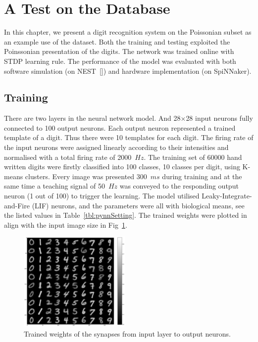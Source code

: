 \section{A Test on the Database}
\label{sec:test}
In this chapter, we present a digit recognition system on the Poissonian subset as an example use of the dataset.
Both the training and testing exploited the Poinssonian presentation of the digits.
The network was trained online with STDP learning rule.
The performance of the model was evaluated with both software simulation (on NEST~[\cite{gewaltig2007nest}]) and hardware implementation (on SpiNNaker). 
\subsection{Training}
There are two layers in the neural network model.
And 28$\times$28 input neurons fully connected to 100 output neurons.
Each output neuron represented a trained template of a digit.
Thus there were 10 templates for each digit.
The firing rate of the input neurons were assigned linearly according to their intensities and normalised with a total firing rate of 2000~$Hz$.
The training set of 60000 hand written digits were firstly classified into 100 classes, 10 classes per digit, using K-means clusters.
Every image was presented 300~$ms$ during training and at the same time a teaching signal of 50~$Hz$ was conveyed to the responding output neuron (1 out of 100) to trigger the learning.
The model utilised Leaky-Integrate-and-Fire (LIF) neurons, and the parameters were all with biological means, see the listed values in Table~\ref{tbl:pynnSetting}.
The trained weights were plotted in align with the input image size in Fig~\ref{Fig:weight}.
\begin{figure}[hbt!]
	\centering
	\includegraphics[width=0.48\textwidth]{images/weight.pdf}
	\caption{Trained weights of the synapses from input layer to output neurons.}
	\label{Fig:weight}
\end{figure}  

